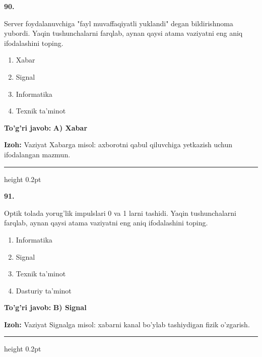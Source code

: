 \documentclass[10pt,a4paper,oneside]{article}
\begin{document}
\noindent\textbf{\color{ink}90.}
\par
Server foydalanuvchiga "fayl muvaffaqiyatli yuklandi" degan bildirishnoma yubordi. Yaqin tushunchalarni farqlab, aynan qaysi atama vaziyatni eng aniq ifodalashini toping.
\begin{enumerate}[label=\Alph*),leftmargin=9mm]
\item Xabar
\item Signal
\item Informatika
\item Texnik ta'minot
\end{enumerate}
\begin{tcolorbox}[enhanced,breakable,colback=teal!4,colframe=teal!50!black,boxrule=0.5pt,arc=1.1mm,left=3mm,right=3mm,top=1.7mm,bottom=1.7mm,before skip=2mm,after skip=2mm]
\textbf{\color{teal}To'g'ri javob:} \textbf{A) Xabar}
\par\smallskip
\textbf{Izoh:} Vaziyat Xabarga misol: axborotni qabul qiluvchiga yetkazish uchun ifodalangan mazmun.
\end{tcolorbox}
\vspace{2mm}\hrule height 0.2pt \vspace{3mm}

\noindent\textbf{\color{ink}91.}
\par
Optik tolada yorug'lik impulslari 0 va 1 larni tashidi. Yaqin tushunchalarni farqlab, aynan qaysi atama vaziyatni eng aniq ifodalashini toping.
\begin{enumerate}[label=\Alph*),leftmargin=9mm]
\item Informatika
\item Signal
\item Texnik ta'minot
\item Dasturiy ta'minot
\end{enumerate}
\begin{tcolorbox}[enhanced,breakable,colback=teal!4,colframe=teal!50!black,boxrule=0.5pt,arc=1.1mm,left=3mm,right=3mm,top=1.7mm,bottom=1.7mm,before skip=2mm,after skip=2mm]
\textbf{\color{teal}To'g'ri javob:} \textbf{B) Signal}
\par\smallskip
\textbf{Izoh:} Vaziyat Signalga misol: xabarni kanal bo'ylab tashiydigan fizik o'zgarish.
\end{tcolorbox}
\vspace{2mm}\hrule height 0.2pt \vspace{3mm}
\end{document}
